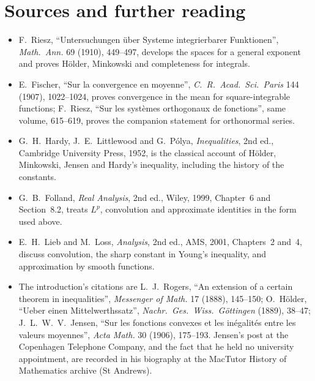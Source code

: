 \section*{Sources and further reading}

\begin{itemize}
\item F.~Riesz, ``Untersuchungen \"uber Systeme integrierbarer Funktionen'', \emph{Math.\ Ann.} 69 (1910), 449--497, develops the spaces for a general exponent and proves Hölder, Minkowski and completeness for integrals.
\item E.~Fischer, ``Sur la convergence en moyenne'', \emph{C.\ R.\ Acad.\ Sci.\ Paris} 144 (1907), 1022--1024, proves convergence in the mean for square-integrable functions; F.~Riesz, ``Sur les syst\`emes orthogonaux de fonctions'', same volume, 615--619, proves the companion statement for orthonormal series.
\item G.~H.~Hardy, J.~E.~Littlewood and G.~P\'olya, \emph{Inequalities}, 2nd ed., Cambridge University Press, 1952, is the classical account of Hölder, Minkowski, Jensen and Hardy's inequality, including the history of the constants.
\item G.~B.~Folland, \emph{Real Analysis}, 2nd ed., Wiley, 1999, Chapter~6 and Section~8.2, treats $L^p$, convolution and approximate identities in the form used above.
\item E.~H.~Lieb and M.~Loss, \emph{Analysis}, 2nd ed., AMS, 2001, Chapters~2 and~4, discuss convolution, the sharp constant in Young's inequality, and approximation by smooth functions.
\item The introduction's citations are L.~J.~Rogers, ``An extension of a certain theorem in inequalities'', \emph{Messenger of Math.} 17 (1888), 145--150; O.~H\"older, ``Ueber einen Mittelwerthssatz'', \emph{Nachr.\ Ges.\ Wiss.\ G\"ottingen} (1889), 38--47; J.~L.~W.~V.~Jensen, ``Sur les fonctions convexes et les in\'egalit\'es entre les valeurs moyennes'', \emph{Acta Math.} 30 (1906), 175--193. Jensen's post at the Copenhagen Telephone Company, and the fact that he held no university appointment, are recorded in his biography at the MacTutor History of Mathematics archive (St Andrews).
\end{itemize}
